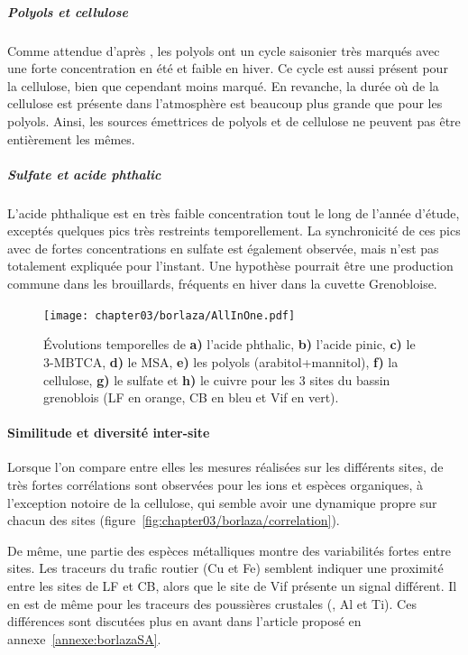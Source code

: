 \subparagraph{Polyols et cellulose}%
\label{par:oxydation_secondaire_anthrophique}

Comme attendue d'après \cite{samakePolyols2019}, les polyols ont un cycle saisonier très
marqués avec une forte concentration en été et faible en hiver. Ce cycle est aussi
présent pour la cellulose, bien que cependant moins marqué. En revanche, la durée où de
la cellulose est présente dans l'atmosphère est beaucoup plus grande que pour les
polyols.  Ainsi, les sources émettrices de polyols et de cellulose ne peuvent pas être
entièrement les mêmes.

\subparagraph{Sulfate et acide phthalic}%
\label{par:sulfate_et_acide_phthalic}

L'acide phthalique est en très faible concentration tout le long de l'année d'étude,
exceptés quelques pics très restreints temporellement. La synchronicité de ces pics avec
de fortes concentrations en sulfate est également observée, mais n'est pas totalement
expliquée pour l'instant.
Une hypothèse pourrait être une production commune dans les brouillards, fréquents en
hiver dans la cuvette Grenobloise.


\begin{figure}[ht]
    \centering
    \texttt{[image: chapter03/borlaza/AllInOne.pdf]}
    \caption{
        Évolutions temporelles de \textbf{a)} l'acide phthalic, \textbf{b)} l'acide
        pinic, \textbf{c)} le 3-MBTCA, \textbf{d)} le MSA, \textbf{e)} les polyols
        (arabitol+mannitol), \textbf{f)} la cellulose, \textbf{g)} le sulfate et
        \textbf{h)} le cuivre pour les 3 sites du bassin grenoblois (LF en orange, CB en
        bleu et Vif en vert).
    }%
    \label{fig:borlaza_evolution_temporelle}
\end{figure}

\paragraph{Similitude et diversité inter-site}%
\label{par:similitude_et_diversité_inter_site}

Lorsque l'on compare entre elles les mesures réalisées sur les différents sites, de très
fortes corrélations sont observées pour les ions et espèces organiques, à l'exception
notoire de la cellulose, qui semble avoir une dynamique propre sur chacun des sites
(figure~\ref{fig:chapter03/borlaza/correlation}).

De même, une partie des espèces métalliques montre des variabilités fortes entre sites.
Les traceurs du trafic routier (Cu et Fe) semblent indiquer une proximité entre les sites
de LF et CB, alors que le site de Vif présente un signal différent. Il en est de même
pour les traceurs des poussières crustales (, Al et Ti). Ces différences sont
discutées plus en avant dans l'article proposé en annexe~\ref{annexe:borlazaSA}.

